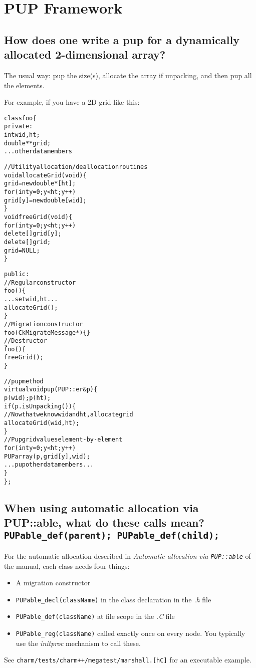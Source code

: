 \section{PUP Framework}

\subsection{How does one write a pup for a dynamically allocated 2-dimensional array?}

The usual way: pup the size(s), allocate the array if unpacking, and
then pup all the elements.

For example, if you have a 2D grid like this:
\begin{alltt}
class foo \{
 private:
  int wid,ht;
  double **grid;
  ...other data members

  //Utility allocation/deallocation routines
  void allocateGrid(void) \{
    grid=new double*[ht];
    for (int y=0;y<ht;y++)
      grid[y]=new double[wid];
  \}
  void freeGrid(void) \{
    for (int y=0;y<ht;y++)
      delete[] grid[y];
    delete[] grid;
    grid=NULL;
  \}

 public:
  //Regular constructor
  foo() \{
    ...set wid, ht...
    allocateGrid();
  \}
  //Migration constructor
  foo(CkMigrateMessage *) \{\}
  //Destructor
  \~foo() \{
    freeGrid();
  \}

  //pup method
  virtual void pup(PUP::er \&p) \{
    p(wid); p(ht);
    if (p.isUnpacking()) \{
      //Now that we know wid and ht, allocate grid
      allocateGrid(wid,ht);
    \}
    //Pup grid values element-by-element
    for (int y=0;y<ht;y++)
      PUParray(p, grid[y], wid);
    ...pup other data members...
  \}
\};
\end{alltt}

\subsection{When using automatic allocation via PUP::able, what do these calls mean?
{\tt PUPable\_def(parent); PUPable\_def(child);}}

For the automatic allocation described in {\em Automatic allocation via
{\tt PUP::able}} of the manual, each class needs four things:
\begin{itemize}
\item A migration constructor

\item
{\tt PUPable\_decl(className)} in the class declaration in the {\em .h}
file

\item
{\tt PUPable\_def(className)} at file scope in the {\em .C} file

\item
{\tt PUPable\_reg(className)} called exactly once on every node. You
typically use the {\em initproc} mechanism to call these.
\end{itemize}
See {\tt charm/tests/charm++/megatest/marshall.[hC]} for an executable
example.

